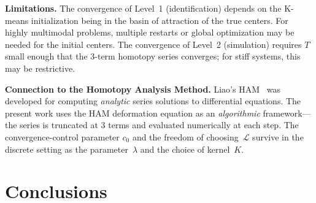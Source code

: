 \documentclass[11pt,a4paper]{article}
\begin{document}
\textbf{Limitations.} The convergence of Level~1 (identification) depends on the K-means initialization being in the basin of attraction of the true centers. For highly multimodal problems, multiple restarts or global optimization may be needed for the initial centers. The convergence of Level~2 (simulation) requires $T$ small enough that the 3-term homotopy series converges; for stiff systems, this may be restrictive.

\textbf{Connection to the Homotopy Analysis Method.} Liao's HAM~\cite{Liao2003} was developed for computing \emph{analytic} series solutions to differential equations. The present work uses the HAM deformation equation as an \emph{algorithmic} framework---the series is truncated at 3 terms and evaluated numerically at each step. The convergence-control parameter $c_0$ and the freedom of choosing~$\mathcal{L}$ survive in the discrete setting as the parameter~$\lambda$ and the choice of kernel~$K$.


\section{Conclusions}
\label{sec:conclusions}
\end{document}
